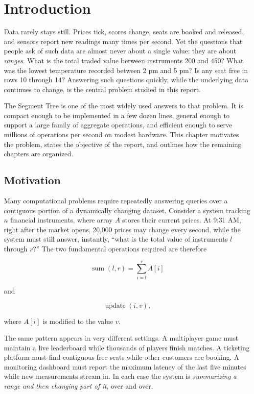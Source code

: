 \chapter{Introduction}
\label{ch:intro}

Data rarely stays still. Prices tick, scores change, seats are booked and released, and sensors report new readings many times per second. Yet the questions that people ask of such data are almost never about a single value: they are about \emph{ranges}. What is the total traded value between instruments 200 and 450? What was the lowest temperature recorded between 2 pm and 5 pm? Is any seat free in rows 10 through 14? Answering such questions quickly, while the underlying data continues to change, is the central problem studied in this report.

The Segment Tree is one of the most widely used answers to that problem. It is compact enough to be implemented in a few dozen lines, general enough to support a large family of aggregate operations, and efficient enough to serve millions of operations per second on modest hardware. This chapter motivates the problem, states the objective of the report, and outlines how the remaining chapters are organized.

\section{Motivation}
Many computational problems require repeatedly answering queries over a contiguous portion of a dynamically changing dataset. Consider a system tracking $n$ financial instruments, where array $A$ stores their current prices. At 9:31 AM, right after the market opens, 20{,}000 prices may change every second, while the system must still answer, instantly, ``what is the total value of instruments $l$ through $r$?'' The two fundamental operations required are therefore

\begin{equation}
\operatorname{sum}(l,r) = \sum_{i=l}^{r} A[i]
\label{eq:sum}
\end{equation}

and

\begin{equation}
\operatorname{update}(i,v),
\label{eq:update}
\end{equation}

where $A[i]$ is modified to the value $v$.

The same pattern appears in very different settings. A multiplayer game must maintain a live leaderboard while thousands of players finish matches. A ticketing platform must find contiguous free seats while other customers are booking. A monitoring dashboard must report the maximum latency of the last five minutes while new measurements stream in. In each case the system is \emph{summarizing a range and then changing part of it}, over and over.

